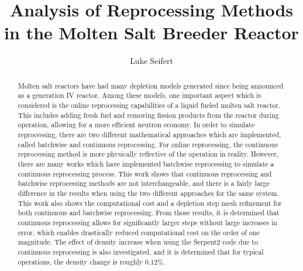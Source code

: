 \documentclass[edeposit,fullpage]{uiucthesis2018}
\title{Analysis of Reprocessing Methods in the Molten Salt Breeder Reactor}
\author{Luke Seifert}
\begin{document}
\maketitle

\frontmatter
\begin{abstract}

Molten salt reactors have had many depletion models generated since being announced as a generation IV reactor. Among these models, one important aspect which is considered is the online reprocessing capabilities of a liquid fueled molten salt reactor. This includes adding fresh fuel and removing fission products from the reactor during operation, allowing for a more efficient neutron economy.
In order to simulate reprocessing, there are two different mathematical approaches which are implemented, called batchwise and continuous reprocessing. For online reprocessing, the continuous reprocessing method is more physically reflective of the operation in reality. However, there are many works which have implemented batchwise reprocessing to simulate a continuous reprocessing process.
This work shows that continuous reprocessing and batchwise reprocessing methods are not interchangeable, and there is a fairly large difference in the results when using the two different approaches for the same system. This work also shows the computational cost and a depletion step mesh refinement for both continuous and batchwise reprocessing. From those results, it is determined that continuous reprocessing allows for significantly larger steps without large increases in error, which enables drastically reduced computational cost on the order of one magnitude. The effect of density increase when using the Serpent2 code due to continuous reprocessing is also investigated, and it is determined that for typical operations, the density change is roughly 0.12\%.


\end{abstract}



\end{document}
